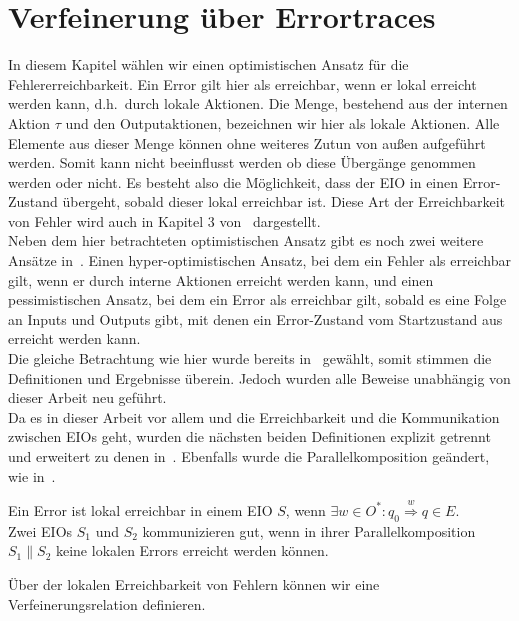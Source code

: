 \chapter{Verfeinerung über Errortraces}

In diesem Kapitel wählen wir einen optimistischen Ansatz für die
Fehlererreichbarkeit. Ein Error gilt hier als erreichbar, wenn er lokal
erreicht werden kann, d.h.\ durch lokale Aktionen. Die Menge, bestehend aus der
internen Aktion $\tau$ und den Outputaktionen, bezeichnen wir hier als lokale
Aktionen. Alle Elemente aus dieser Menge können ohne
weiteres Zutun von außen aufgeführt werden. Somit kann nicht beeinflusst werden ob diese
Übergänge genommen werden oder nicht. Es besteht also die Möglichkeit, dass
der EIO in einen Error-Zustand übergeht, sobald dieser lokal erreichbar ist. Diese
Art der Erreichbarkeit von Fehler wird auch in Kapitel 3 von~\cite{Vogler2014EIO}
dargestellt.\\
Neben dem hier betrachteten optimistischen Ansatz gibt es noch zwei weitere
Ansätze in~\cite{Vogler2014EIO}. Einen hyper-optimistischen Ansatz, bei dem ein
Fehler als erreichbar gilt, wenn er durch interne Aktionen erreicht werden
kann, und einen pessimistischen Ansatz, bei dem ein Error als erreichbar gilt,
sobald es eine Folge an Inputs und Outputs gibt, mit denen ein Error-Zustand
vom Startzustand aus erreicht werden kann.\\
Die gleiche Betrachtung wie hier wurde bereits in~\cite{Schlosser2012BA} gewählt, somit
stimmen die Definitionen und Ergebnisse überein. Jedoch wurden alle Beweise unabhängig von
dieser Arbeit neu geführt.\\
Da es in dieser Arbeit vor allem und die Erreichbarkeit und die Kommunikation
zwischen EIOs geht, wurden die nächsten beiden Definitionen explizit getrennt
und erweitert zu denen in~\cite{Vogler2014EIO}. Ebenfalls wurde die
Parallelkomposition geändert, wie in~\cite{Schlosser2012BA}.

\begin{Def}
  Ein Error ist lokal erreichbar in einem EIO $S$, wenn $\exists w\in O^*: q_0
  \overset{w}{\Rightarrow} q\in E$.\\
  Zwei EIOs $S_1$ und $S_2$ kommunizieren gut, wenn in ihrer
  Parallelkomposition $S_1\| S_2$ keine lokalen Errors erreicht werden können.
\end{Def}

Über der lokalen Erreichbarkeit von Fehlern können wir eine
Verfeinerungsrelation definieren.

